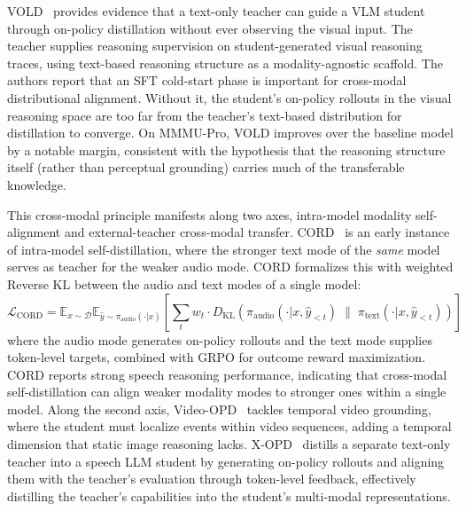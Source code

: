 \documentclass{article} %
\newcommand{\E}{\mathbb{E}}
\newcommand{\KL}{D_{\mathrm{KL}}}
\newcommand{\loss}{\mathcal{L}}
\begin{document}
VOLD~\citep{2510.23497} provides evidence that a text-only teacher can guide a VLM student through on-policy distillation without ever observing the visual input. The teacher supplies reasoning supervision on student-generated visual reasoning traces, using text-based reasoning structure as a modality-agnostic scaffold. The authors report that an SFT cold-start phase is important for cross-modal distributional alignment. Without it, the student's on-policy rollouts in the visual reasoning space are too far from the teacher's text-based distribution for distillation to converge. On MMMU-Pro, VOLD improves over the baseline model by a notable margin, consistent with the hypothesis that the reasoning structure itself (rather than perceptual grounding) carries much of the transferable knowledge.

This cross-modal principle manifests along two axes, intra-model modality self-alignment and external-teacher cross-modal transfer. CORD~\citep{2601.16547} is an early instance of intra-model self-distillation, where the stronger text mode of the \emph{same} model serves as teacher for the weaker audio mode. CORD formalizes this with weighted Reverse KL between the audio and text modes of a single model:
\begin{equation*}
    \loss_{\text{CORD}} = \E_{x \sim \mathcal{D}} \E_{\hat{y} \sim \pi_{\text{audio}}(\cdot|x)} \left[ \sum_{t} w_t \cdot \KL\!\left(\pi_{\text{audio}}(\cdot|x, \hat{y}_{<t}) \;\|\; \pi_{\text{text}}(\cdot|x, \hat{y}_{<t})\right) \right]
\end{equation*}
where the audio mode generates on-policy rollouts and the text mode supplies token-level targets, combined with GRPO for outcome reward maximization. CORD reports strong speech reasoning performance, indicating that cross-modal self-distillation can align weaker modality modes to stronger ones within a single model. Along the second axis, Video-OPD~\citep{2602.02994} tackles temporal video grounding, where the student must localize events within video sequences, adding a temporal dimension that static image reasoning lacks. X-OPD~\citep{2603.24596} distills a separate text-only teacher into a speech LLM student by generating on-policy rollouts and aligning them with the teacher's evaluation through token-level feedback, effectively distilling the teacher's capabilities into the student's multi-modal representations.
\end{document}
